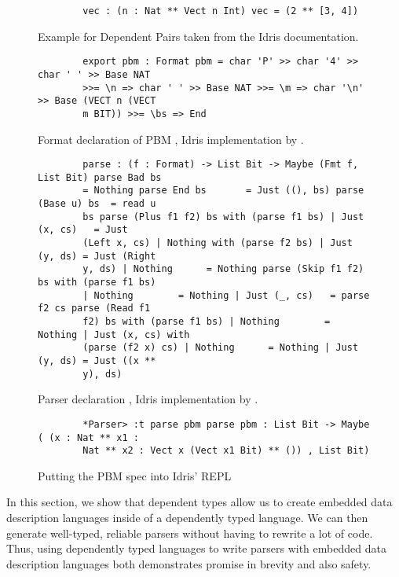 \begin{figure}
    \caption{Example for Dependent Pairs taken from the Idris documentation.}
    \label{dependentPairExample}
    \begin{lstlisting}
        vec : (n : Nat ** Vect n Int) vec = (2 ** [3, 4])
    \end{lstlisting}
\end{figure}

\begin{figure}
    \caption{Format declaration of PBM \cite{power_of_pi}, Idris implementation
    by \cite{idris_pop}.}
    \label{spec_declaration}
    \begin{lstlisting}
        export pbm : Format pbm = char 'P' >> char '4' >> char ' ' >> Base NAT
        >>= \n => char ' ' >> Base NAT >>= \m => char '\n' >> Base (VECT n (VECT
        m BIT)) >>= \bs => End
    \end{lstlisting}
\end{figure}


\begin{figure}
    \caption{Parser declaration \cite{power_of_pi}, Idris implementation by
    \cite{idris_pop}.}
    \label{parser}
    \begin{lstlisting}
        parse : (f : Format) -> List Bit -> Maybe (Fmt f, List Bit) parse Bad bs
        = Nothing parse End bs       = Just ((), bs) parse (Base u) bs  = read u
        bs parse (Plus f1 f2) bs with (parse f1 bs) | Just (x, cs)   = Just
        (Left x, cs) | Nothing with (parse f2 bs) | Just (y, ds) = Just (Right
        y, ds) | Nothing      = Nothing parse (Skip f1 f2) bs with (parse f1 bs)
        | Nothing        = Nothing | Just (_, cs)   = parse f2 cs parse (Read f1
        f2) bs with (parse f1 bs) | Nothing        = Nothing | Just (x, cs) with
        (parse (f2 x) cs) | Nothing      = Nothing | Just (y, ds) = Just ((x **
        y), ds)
    \end{lstlisting}
\end{figure}

\begin{figure}
    \caption{Putting the PBM spec into Idris' REPL}
    \label{repl}
    \begin{lstlisting}
        *Parser> :t parse pbm parse pbm : List Bit -> Maybe ( (x : Nat ** x1 :
        Nat ** x2 : Vect x (Vect x1 Bit) ** ()) , List Bit)
    \end{lstlisting}
\end{figure}

In this section, we show that dependent types allow us to create embedded data
description languages inside of a dependently typed language. We can then
generate well-typed, reliable parsers without having to rewrite a lot of code.
Thus, using dependently typed languages to write parsers with embedded data
description languages both demonstrates promise in brevity and also safety. 

